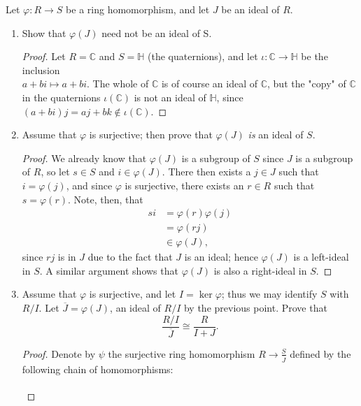\documentclass[12pt]{article}
\newenvironment{problem}[2][Problem]{\begin{trivlist}
\item[\hskip \labelsep {\bfseries #1}\hskip \labelsep {\bfseries #2.}]}{\end{trivlist}}
\newenvironment{sproof}{
  \renewcommand\qedsymbol{$\square$}
  \begin{proof}
  }{
  \end{proof}
}
\theoremstyle{remark}
\begin{document}
\begin{problem}{3.3}
Let $\varphi:R\to S$ be a ring homomorphism, and let $J$ be an ideal of $R$.
\end{problem}
\begin{enumerate}
  \item Show that $\varphi(J)$ need not be an ideal of S.
    \begin{sproof}
      Let $R=\mathbb{C}$ and $S=\mathbb{H}$ (the quaternions), and let $\iota:\mathbb{C}\to\mathbb{H}$ be the
      inclusion \\$a+bi\mapsto a+bi$.
      The whole of $\mathbb{C}$ is of course an ideal of $\mathbb{C}$, but
      the "copy" of $\mathbb{C}$ in the quaternions $\iota(\mathbb{C})$ is not an ideal
      of $\mathbb{H}$, since $(a+bi)j = aj+bk\notin\iota(\mathbb{C})$.
    \end{sproof}
  \item Assume that $\varphi$ is surjective; then prove that $\varphi(J)$ \textit{is} an ideal of $S$.
    \begin{proof}
    We already know that $\varphi(J)$ is a subgroup of $S$ since $J$ is a subgroup of $R$, so
    let $s\in S$ and $i\in \varphi(J)$.
    There then exists a $j\in J$ such that $i=\varphi(j)$, and since $\varphi$ is 
    surjective, there exists an $r\in R$ such that $s=\varphi(r)$.
    Note, then, that  
      \begin{align*}
        si &= \varphi(r)\varphi(j) \\
           &= \varphi(rj)\\
           &\in \varphi(J),
      \end{align*}
      since $rj$ is in $J$ due to the fact that $J$ is an ideal; 
      hence $\varphi(J)$ is a left-ideal in $S$.
      A similar argument shows that $\varphi(J)$ is also a right-ideal in $S$.
    \end{proof}
  \item Assume that $\varphi$ is surjective, and let $I=\ker\varphi$; thus we may identify
  $S$ with $R/I$.
  Let $\overline J=\varphi(J)$, an ideal of $R/I$ by the previous point.
  Prove that
  \begin{equation*}
    \frac{R/I}{\overline{J}}\cong\frac{R}{I+J}.
  \end{equation*}
    \begin{sproof}
      Denote by $\psi$ the surjective ring homomorphism 
      $R\to \displaystyle\frac{S}{\overline{J}}$ defined by the following chain
      of homomorphisms:
      \[
      \begin{tikzcd}

\end{tikzcd}\]
\end{sproof}
\end{enumerate}
\end{document}
